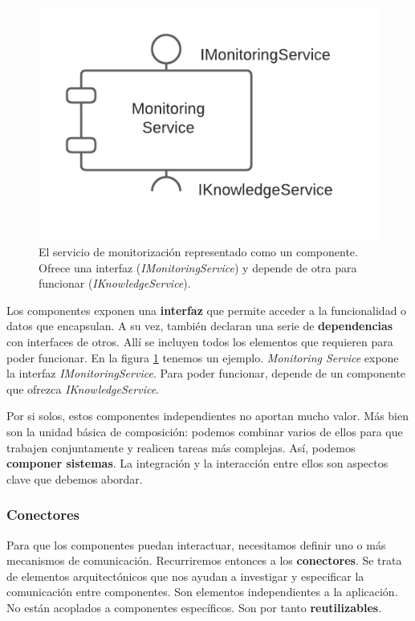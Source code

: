 \begin{figure}
  \centering
  \includegraphics[scale=0.8]{cap_contexto_tecnologico/images/componente-ejemplo}
  \caption{El servicio de monitorización representado como un componente. Ofrece una interfaz (\emph{IMonitoringService}) y depende de otra para funcionar (\emph{IKnowledgeService}).}
  \label{fig:componenteEjemplo}
\end{figure}

Los componentes exponen una \textbf{interfaz} que permite acceder a la funcionalidad o datos que encapsulan. A su vez, también declaran una serie de \textbf{dependencias} con interfaces de otros. Allí se incluyen todos los elementos que requieren para poder funcionar. En la figura \ref{fig:componenteEjemplo} tenemos un ejemplo. \emph{Monitoring Service} expone la interfaz \emph{IMonitoringService}. Para poder funcionar, depende de un componente que ofrezca \emph{IKnowledgeService}.

Por si solos, estos componentes independientes no aportan mucho valor. Más bien son la unidad básica de composición: podemos combinar varios de ellos para que trabajen conjuntamente y realicen tareas más complejas. Así, podemos \textbf{componer sistemas}. \cite{mehtaTaxonomySoftwareConnectors2000} La integración y la interacción entre ellos son aspectos clave que debemos abordar.

\subsubsection{Conectores}

Para que los componentes puedan interactuar, necesitamos definir uno o más mecanismos de comunicación. Recurriremos entonces a los \textbf{conectores}. Se trata de elementos arquitectónicos que nos ayudan a investigar y especificar la comunicación entre componentes. \cite{perryFoundationsStudySoftware1992} Son elementos independientes a la aplicación. No están acoplados a componentes específicos. Son por tanto \textbf{reutilizables}. \cite{taylorComponentMessagebasedArchitectural1996a}

